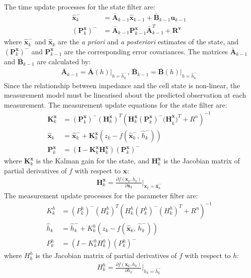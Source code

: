 \documentclass[journal, english]{IEEEtran}
\begin{document}
The time update processes for the state filter are:
\begin{align}
\hat{\mathbf{x}}_{k}^{-} & =\bar{\mathbf{A}}_{k-1}\hat{\mathbf{x}}_{k-1}+\bar{\mathbf{B}}_{k-1}\mathbf{u}_{k-1}\\
(\mathbf{P}_{k}^{\mathbf{x}})^{-} & =\bar{\mathbf{A}}_{k-1}\mathbf{P}_{k-1}^{\mathbf{x}}\bar{\mathbf{A}}_{k-1}^{T}+\mathbf{R}^{\mathbf{v}}
\end{align}
where $\mathbf{\hat{x}}_{k}^{-}$ and $\mathbf{\hat{x}}_{k}$ are
the \emph{a priori }and \emph{a posteriori} estimates of the state,
and $(\mathbf{P}_{k}^{\mathbf{x}})^{-}$ and $\mathbf{P}_{k-1}^{\mathbf{x}}$
are the corresponding\emph{ }error covariances. The matrices $\bar{\mathbf{A}}_{k-1}$
and $\bar{\mathbf{B}}_{k-1}$ are calculated by:
\begin{align}
\bar{\mathbf{A}}_{k-1}=\bar{\mathbf{A}}(h)\big|_{h=\hat{h}_{k}^{-}},\,\bar{\mathbf{B}}_{k-1}=\bar{\mathbf{B}}(h)\big|_{h=\hat{h}_{k}^{-}}
\end{align}
Since the relationship between impedance and the cell state is non-linear,
the measurement model must be linearised about the predicted observation
at each measurement. The measurement update equations for the state
filter are:
\begin{align}
\mathbf{K}_{k}^{\mathbf{x}} & =(\mathbf{P}_{k}^{\mathbf{x}})^{-}(\mathbf{H}_{k}^{\mathbf{x}})^{T}\left(\mathbf{H}_{k}^{\mathbf{x}}(\mathbf{P}_{k}^{\mathbf{x}})^{-}\mathbf{(H}_{k}^{\mathbf{x}})^{T}+R^{n}\right)^{-1}\\
\hat{\mathbf{x}}_{k} & =\hat{\mathbf{x}}_{k}^{-}+\mathbf{K}_{k}^{\mathbf{x}}\left(z_{k}-f(\mathbf{\hat{x}}_{k}^{-},\,\hat{h}_{k}^{-})\right)\\
\mathbf{P}_{k}^{\mathbf{x}} & =(\mathbf{I}-\mathbf{K}_{k}^{\mathbf{x}}\mathbf{H}_{k}^{\mathbf{x}})(\mathbf{P}_{k}^{\mathbf{x}})^{-}
\end{align}
where $\mathbf{K}_{k}^{\mathbf{x}}$ is the Kalman gain
for the state,\emph{ }and $\mathbf{H}_{k}^{\mathbf{x}}$ is the Jacobian
matrix of partial derivatives of $f$ with respect to $\mathbf{x}$:
\begin{align}
\mathbf{H}_{k}^{\mathbf{x}}=\frac{\partial f(\mathbf{x}_k,h_k)}{\partial\mathbf{x}_k}\Bigg|_{\mathbf{x}_k=\hat{\mathbf{x}}_{k}^{-}}
\end{align}
The measurement update processes for the parameter filter are:
\begin{align}
K_{k}^{h} & =(P_{k}^{h})^{-}(H_{k}^{h})^{T}\left(H_{k}^{h}(P_{k}^{h})^{-}(H_{k}^{h})^{T}+R^{n}\right)^{-1}\label{eq:param-filt-4}\\
\hat{h}_{k} & =\hat{h}_{k}^{-}+K_{k}^{h}\left(z_{k}-f(\mathbf{\hat{x}}_{k},\,\hat{h}_{k}^{-})\right)\\
P_{k}^{h} & =(I-K_{k}^{h}H_{k}^{h})(P_{k}^{h})^{-}
\end{align}
where $H_{k}^{h}$ is the Jacobian matrix of partial derivatives of
$f$ with respect to $h$:
\begin{align}
H_{k}^{h}=\frac{\partial f(\mathbf{x}_k,h_k)}{\partial h_k}\Bigg|_{ h_k=\hat{h}_{k}^{-}}\label{eq:param-filt-5}
\end{align}
\end{document}
